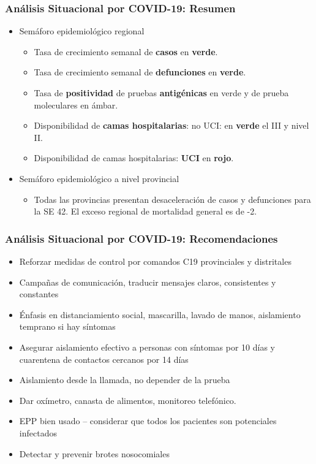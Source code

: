 \documentclass[xcolor=table]{beamer}
\begin{document}
\begin{frame}
	\frametitle{Análisis Situacional por COVID-19: Resumen}
	\vspace{-.5cm}
	\begin{itemize}
		\item Semáforo epidemiológico regional
		\begin{itemize}
			\item Tasa de crecimiento semanal de \textbf{\color{mycolor4}casos} en \textbf{\color{mycolor3}verde}.
			\item Tasa de crecimiento semanal de \textbf{\color{mycolor4}defunciones} en \textbf{\color{mycolor3}verde}.
			\item Tasa de \textbf{\color{mycolor4}positividad} de pruebas \textbf{\color{mycolor4}antigénicas} en verde y de prueba moleculares en ámbar.
			\item Disponibilidad de \textbf{\color{mycolor4}camas hospitalarias}: no UCI: en \textbf{\color{mycolor3}verde} el III y nivel II.
			\item Disponibilidad de camas hospitalarias: \textbf{\color{mycolor4}UCI} en \textbf{\color{mycolor3}rojo}.
		\end{itemize} 
		\item Semáforo epidemiológico a nivel provincial
		\begin{itemize}
			\item Todas las provincias presentan desaceleración de casos y defunciones para la SE 42. El exceso regional de mortalidad general es de -2.
	
		\end{itemize}
	\end{itemize}
\end{frame}

\begin{frame}[label=recomendaciones]
	\frametitle{Análisis Situacional por COVID-19: Recomendaciones}
	\vspace{-.5cm}
	\begin{itemize}
			\item Reforzar medidas de control por comandos C19 provinciales y distritales
			\item Campañas de comunicación, traducir mensajes claros, consistentes y constantes
			\item Énfasis en distanciamiento social, mascarilla, lavado de manos, aislamiento temprano si hay síntomas
			\item Asegurar aislamiento efectivo a personas con síntomas por 10 días y cuarentena de contactos cercanos por 14 días
			\item Aislamiento desde la llamada, no depender de la prueba
			\item Dar oxímetro, canasta de alimentos, monitoreo telefónico. 
			\item EPP bien usado – considerar que todos los pacientes son potenciales infectados
			\item Detectar y prevenir brotes nosocomiales
			
		\end{itemize} 

\end{frame}
\end{document}
